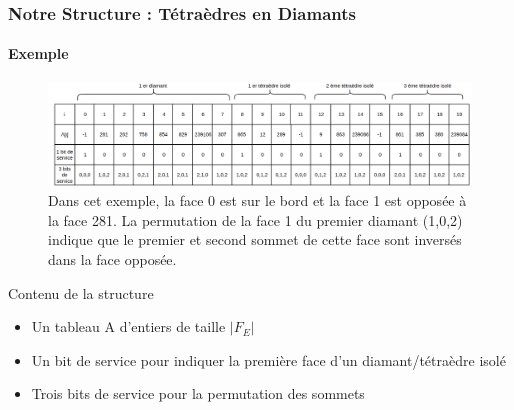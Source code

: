 \documentclass[9pt]{beamer}
\begin{document}
\begin{frame}
\small
\frametitle{Notre Structure : Tétraèdres en Diamants}
\framesubtitle{Exemple}
\begin{figure}[H]
\begin{center}
\includegraphics[scale=0.275]{../Images/structure}
\caption{Dans cet exemple, la face 0 est sur le bord et la face 1 est opposée à la face 281. La permutation de la face 1 du premier diamant (1,0,2) indique que le premier et second sommet de cette face sont inversés dans la face opposée.}
\label{fig:structure}
\end{center}
\end{figure}

\begin{block}{Contenu de la structure}
\begin{itemize}
\item Un tableau A d'entiers de taille $|F_E|$
\item Un bit de service pour indiquer la première face d'un diamant/tétraèdre isolé
\item Trois bits de service pour la permutation des sommets
\end{itemize}
\end{block}





\end{frame}

%
\end{document}
